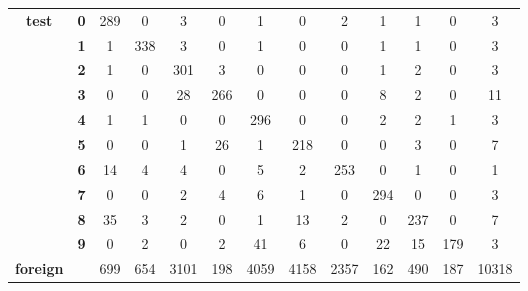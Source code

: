 \begin{table}[htp]
{\begin{tabular}{|c|c|c|c|c|c|c|c|c|c|c|c|c|}
		\multirow{10}{*}{\textbf{test}}     & \textbf{0} & 289        & 0          & 3          & 0          & 1          & 0          & 2          & 1          & 1          & 0          & 3                \\ \cline{2-13} 
		& \textbf{1} & 1          & 338        & 3          & 0          & 1          & 0          & 0          & 1          & 1          & 0          & 3                \\ \cline{2-13} 
		& \textbf{2} & 1          & 0          & 301        & 3          & 0          & 0          & 0          & 1          & 2          & 0          & 3                \\ \cline{2-13} 
		& \textbf{3} & 0          & 0          & 28         & 266        & 0          & 0          & 0          & 8          & 2          & 0          & 11               \\ \cline{2-13} 
		& \textbf{4} & 1          & 1          & 0          & 0          & 296        & 0          & 0          & 2          & 2          & 1          & 3                \\ \cline{2-13} 
		& \textbf{5} & 0          & 0          & 1          & 26         & 1          & 218        & 0          & 0          & 3          & 0          & 7                \\ \cline{2-13} 
		& \textbf{6} & 14         & 4          & 4          & 0          & 5          & 2          & 253        & 0          & 1          & 0          & 1                \\ \cline{2-13} 
		& \textbf{7} & 0          & 0          & 2          & 4          & 6          & 1          & 0          & 294        & 0          & 0          & 3                \\ \cline{2-13} 
		& \textbf{8} & 35         & 3          & 2          & 0          & 1          & 13         & 2          & 0          & 237        & 0          & 7                \\ \cline{2-13} 
		& \textbf{9} & 0          & 2          & 0          & 2          & 41         & 6          & 0          & 22         & 15         & 179        & 3                \\ \hline
		\textbf{foreign}                    & \textbf{}  & 699        & 654        & 3101       & 198        & 4059       & 4158       & 2357       & 162        & 490        & 187        & 10318            \\ \hline
	\end{tabular}
}
\end{table}

